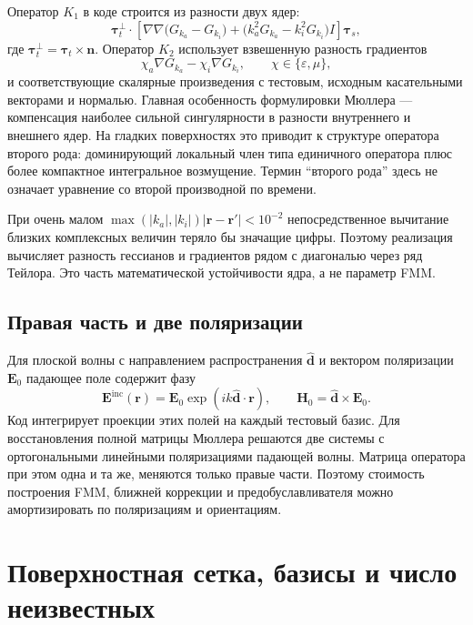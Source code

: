 \documentclass[12pt,a4paper]{article}
\newcommand{\vE}{\mathbf{E}}
\newcommand{\vH}{\mathbf{H}}
\newcommand{\vr}{\mathbf{r}}
\newcommand{\vn}{\mathbf{n}}
\begin{document}
Оператор $K_1$ в коде строится из разности двух ядер:
\begin{equation}
  \boldsymbol\tau_t^{\perp}\!\cdot
  \left[
    \nabla\nabla\bigl(G_{k_a}-G_{k_i}\bigr)
    +\bigl(k_a^2G_{k_a}-k_i^2G_{k_i}\bigr)I
  \right]\boldsymbol\tau_s,
  \label{eq:k1}
\end{equation}
где $\boldsymbol\tau_t^{\perp}=\boldsymbol\tau_t\times\vn$. Оператор $K_2$
использует взвешенную разность градиентов
\begin{equation}
  \chi_a\nabla G_{k_a}-\chi_i\nabla G_{k_i},
  \qquad \chi\in\{\varepsilon,\mu\},
  \label{eq:k2}
\end{equation}
и соответствующие скалярные произведения с тестовым, исходным касательными
векторами и нормалью. Главная особенность формулировки Мюллера --- компенсация
наиболее сильной сингулярности в разности внутреннего и внешнего ядер. На
гладких поверхностях это приводит к структуре оператора второго рода:
доминирующий локальный член типа единичного оператора плюс более компактное
интегральное возмущение. Термин ``второго рода'' здесь не означает уравнение со
второй производной по времени.

При очень малом $\max(|k_a|,|k_i|)|\vr-\vr'|<10^{-2}$ непосредственное
вычитание близких комплексных величин теряло бы значащие цифры. Поэтому
реализация вычисляет разность гессианов и градиентов рядом с диагональю через
ряд Тейлора. Это часть математической устойчивости ядра, а не параметр FMM.

\subsection{Правая часть и две поляризации}

Для плоской волны с направлением распространения $\widehat{\mathbf d}$ и
вектором поляризации $\vE_0$ падающее поле содержит фазу
\begin{equation}
  \vE^{\mathrm{inc}}(\vr)=\vE_0
  \exp(ik\widehat{\mathbf d}\cdot\vr),\qquad
  \vH_0=\widehat{\mathbf d}\times\vE_0.
\end{equation}
Код интегрирует проекции этих полей на каждый тестовый базис. Для восстановления
полной матрицы Мюллера решаются две системы с ортогональными линейными
поляризациями падающей волны. Матрица оператора при этом одна и та же, меняются
только правые части. Поэтому стоимость построения FMM, ближней коррекции и
предобуславливателя можно амортизировать по поляризациям и ориентациям.

\section{Поверхностная сетка, базисы и число неизвестных}
\end{document}
